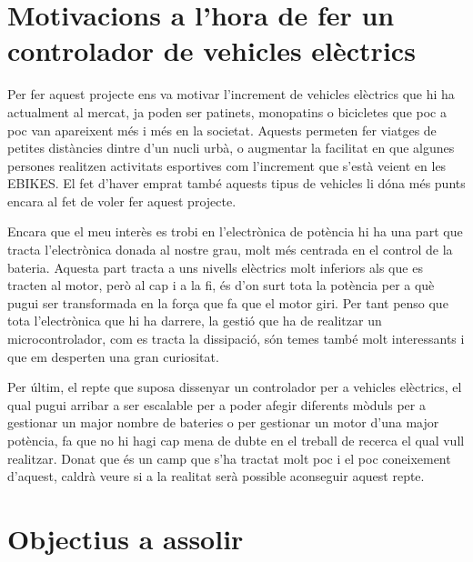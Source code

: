 \section{Motivacions a l'hora de fer un controlador de vehicles elèctrics}
Per fer aquest projecte ens va motivar l'increment de vehicles elèctrics que hi ha actualment al mercat, ja poden ser patinets, monopatins o bicicletes que poc a poc van apareixent més i més en la societat. Aquests permeten fer viatges de petites distàncies dintre d'un nucli urbà, o augmentar la facilitat en que algunes persones realitzen activitats esportives com l'increment que s'està veient en les EBIKES. El fet d'haver emprat també aquests tipus de vehicles li dóna més punts encara al fet de voler fer aquest projecte.
    
Encara que el meu interès es trobi en l'electrònica de potència hi ha una part que tracta l'electrònica donada al nostre grau, molt més centrada en el control de la bateria. Aquesta part tracta a uns nivells elèctrics molt inferiors als que es tracten al motor, però al cap i a la fi, és d'on surt tota la potència per a què pugui ser transformada en la força que fa que el motor giri. Per tant penso que tota l'electrònica que hi ha darrere, la gestió que ha de realitzar un microcontrolador, com es tracta la dissipació, són temes també molt interessants i que em desperten una gran curiositat.

Per últim, el repte que suposa dissenyar un controlador per a vehicles elèctrics, el qual pugui arribar a ser escalable per a poder afegir diferents mòduls per a gestionar un major nombre de bateries o per gestionar un motor d'una major potència, fa que no hi hagi cap mena de dubte en el treball de recerca el qual vull realitzar. Donat que és un camp que s'ha tractat molt poc i el poc coneixement d'aquest, caldrà veure si a la realitat serà possible aconseguir aquest repte. 

\section{Objectius a assolir}

